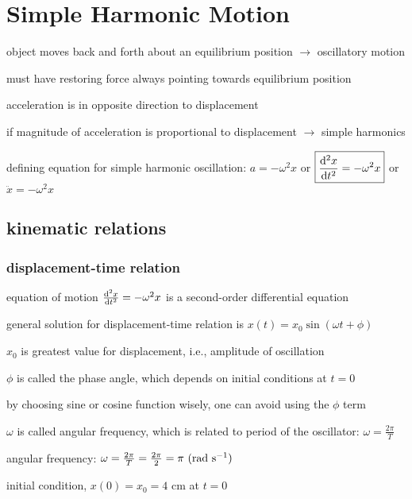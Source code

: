\section{Simple Harmonic Motion}

object moves back and forth about an equilibrium position $\longrightarrow$ oscillatory motion

must have restoring force always pointing towards equilibrium position

acceleration is in opposite direction to displacement

if magnitude of acceleration is proportional to displacement $\longrightarrow$ simple harmonics

defining equation for simple harmonic oscillation: $\boxed{a=-\omega^2x}$ or $\boxed{\frac{\mathrm{d}^2x}{\mathrm{d}t^2} = -\omega^2 x}$ or $\boxed{\ddot{x} = -\omega^2 x}$

\subsection{kinematic relations}

\subsubsection{displacement-time relation}

equation of motion $\frac{\mathrm{d}^2x}{\mathrm{d}t^2} = -\omega^2 x$ is a second-order differential equation

general solution for displacement-time relation is $\boxed{x(t) = x_0 \sin(\omega t + \phi)}$

$x_0$ is greatest value for displacement, i.e., amplitude of oscillation

$\phi$ is called the phase angle, which depends on initial conditions at $t = 0$

by choosing sine or cosine function wisely, one can avoid using the $\phi$ term

$\omega$ is called angular frequency, which is related to period of the oscillator: $\omega = \frac{2\pi}{T}$


angular frequency: $\omega = \frac{2\pi}{T} = \frac{2\pi}{2} = \pi \text{ (rad s$^{-1}$)}$

initial condition, $x(0)=x_0= 4$ cm at $t=0$

